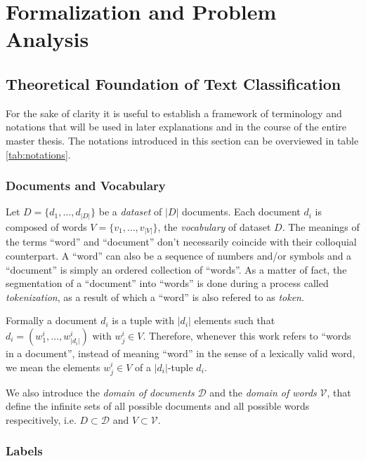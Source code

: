 \chapter{Formalization and Problem Analysis}
\label{ch:problem-analysis}

\section{Theoretical Foundation of Text Classification}
 
 \label{sec:formalization}
For the sake of clarity it is useful to establish a framework of terminology and
notations that will be used in later explanations and in the course of 
the entire master thesis. The notations introduced in this section can be
overviewed in table \ref{tab:notations}.

\subsection{Documents and Vocabulary}

Let $D=\{d_1, \ldots, d_{|D|}\}$ be a \textit{dataset} of $|D|$
documents. Each document $d_i$ is composed of words $V = \{v_1, \ldots,
v_{|V|}\}$, the \textit{vocabulary} of dataset $D$.
The meanings of the terms ``word'' and ``document'' don't necessarily coincide
with their colloquial counterpart. A ``word'' can also be a sequence of numbers
and/or symbols and a ``document'' is simply an ordered collection of ``words''.
As a matter of fact, the segmentation of a ``document'' into ``words'' is done
during a process called \emph{tokenization}, as a result of which a
``word'' is also refered to as \emph{token}.

Formally a document $d_i$ is a tuple with $|d_i|$ elements such that
$d_i = (w_1^i,\ldots,w_{|d_i|}^i)$ with $w_j^i \in V$.
Therefore, whenever this work refers to ``words in a document'', instead of
meaning ``word'' in the sense of a lexically valid word, we mean the elements
$w_j^i \in V$ of a $|d_i|$-tuple $d_i$.

We also introduce the \emph{domain of documents} $\mathcal{D}$ and the
\emph{domain of words} $\mathcal{V}$, that define the infinite sets of all possible
documents and all possible words respecitively, i.e. $D \subset \mathcal{D}$ and $V \subset
\mathcal{V}$.
\subsection{Labels}

